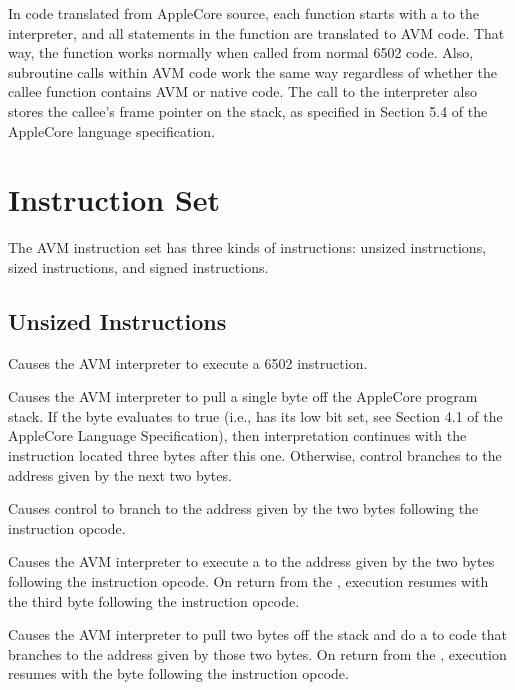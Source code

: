 \documentclass[10pt]{article}
\begin{document}
In code translated from AppleCore source, each function starts with a
 to the interpreter, and all statements in the function are
translated to AVM code.  That way, the function works normally when
called from normal 6502 code.  Also, subroutine calls within AVM
code work the same way regardless of whether the callee function
contains AVM or native code.
The call to the interpreter also stores the callee's frame pointer
on the stack, as specified in Section 5.4 of the AppleCore
language specification.

\section{Instruction Set}

The AVM instruction set has three kinds of instructions: unsized
instructions, sized instructions, and signed instructions.

\subsection{Unsized Instructions}

%
Causes the AVM interpreter to execute a 6502  instruction.

%
Causes the AVM interpreter to pull a single byte off the AppleCore
program stack.  If the byte evaluates to true (i.e., has its low
bit set, see Section 4.1 of the AppleCore Language Specification),
then interpretation continues with the instruction located three
bytes after this one.  Otherwise, control branches to the address
given by the next two bytes.

%
Causes control to branch to the address given by the two bytes
following the instruction opcode.

%
Causes the AVM interpreter to execute a  to the address
given by the two bytes following the instruction opcode.  On
return from the , execution resumes with the third byte
following the instruction opcode.

%
Causes the AVM interpreter to pull two bytes off the stack
and do a  to code that branches to the address given
by those two bytes.  On return from the , execution
resumes with the byte following the instruction opcode.
\end{document}
